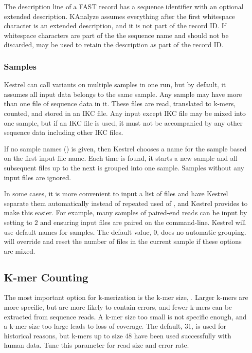 The description line of a FAST record has a sequence identifier with an optional extended description. KAnalyze assumes everything after the first whitespace character is an extended description, and it is not part of the record ID. If whitespace characters are part of the the sequence name and should not be discarded,  may be used to retain the description as part of the record ID.


\subsubsection{Samples}
\label{sec.process.input.samples}

Kestrel can call variants on multiple samples in one run, but by default, it assumes all input data belongs to the same sample. Any sample may have more than one file of sequence data in it. These files are read, translated to k-mers, counted, and stored in an IKC file. Any input except IKC file may be mixed into one sample, but if an IKC file is used, it must not be accompanied by any other sequence data including other IKC files.

If no sample names () is given, then Kestrel chooses a name for the sample based on the first input file name. Each time  is found, it starts a new sample and all subsequent files up to the next  is grouped into one sample. Samples without any input files are ignored.

In some cases, it is more convenient to input a list of files and have Kestrel separate them automatically instead of repeated used of , and Kestrel provides  to make this easier. For example, many samples of paired-end reads can be input by setting  to $2$ and ensuring input files are paired on the command-line. Kestrel will use default names for samples. The default value, $0$, does no automatic grouping.  will override  and reset the number of files in the current sample if these options are mixed.

\subsection{K-mer Counting}
\label{sec.process.kmers}

The most important option for k-merization is the k-mer size, . Larger k-mers are more specific, but are more likely to contain errors, and fewer k-mers can be extracted from sequence reads. A k-mer size too small is not specific enough, and a k-mer size too large leads to loss of coverage. The default, 31, is used for historical reasons, but k-mers up to size 48 have been used successfully with human data. Tune this parameter for read size and error rate.

